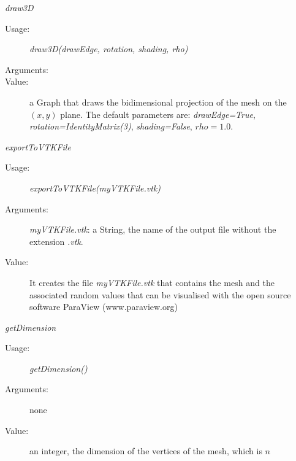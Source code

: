 \begin{description}
\begin{description}
\item \textit{draw3D}
\begin{description}
\item[Usage:] \textit{draw3D(drawEdge, rotation, shading, rho)}
\item[Arguments:]
\item[Value:] a Graph that draws the bidimensional projection of the mesh on the $(x,y)$ plane. The default parameters are: \textit{drawEdge=True}, \textit{rotation=IdentityMatrix(3)}, \textit{shading=False}, $rho=1.0$.
\end{description}
\bigskip

\item \textit{exportToVTKFile}
\begin{description}
\item[Usage:] \textit{exportToVTKFile(myVTKFile.vtk)}
\item[Arguments:] \textit{myVTKFile.vtk}: a String, the name of the output file without the extension  \emph{.vtk}.
\item[Value:] It creates the file \textit{myVTKFile.vtk} that contains the mesh and the associated random values that can be visualised with the open source software ParaView (www.paraview.org)
\end{description}
\bigskip


\item \textit{getDimension}
\begin{description}
\item[Usage:] \textit{getDimension()}
\item[Arguments:] none
\item[Value:] an integer, the dimension of the vertices of the mesh, which is $n$
\end{description}
\bigskip


\end{description}
\end{description}
